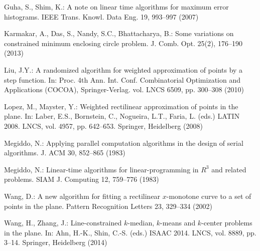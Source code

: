 \documentclass[preprint,10pt]{elsarticle}
\begin{document}
\begin{thebibliography}{10}
Guha, S., Shim, K.: A note on linear time algorithms for maximum error
  histograms. IEEE Trans. Knowl. Data Eng.  19,  993--997 (2007)

Karmakar, A., Das, S., Nandy, S.C., Bhattacharya, B.: Some variations on
  constrained minimum enclosing circle problem. J. Comb. Opt.  25(2),  176--190
  (2013)

Liu, J.Y.: A randomized algorithm for weighted approximation of points by a
  step function. In: Proc. 4th Ann. Int. Conf. Combinatorial Optimization and
  Applications (COCOA), Springer-Verlag. vol. LNCS 6509, pp. 300--308 (2010)

Lopez, M., Mayster, Y.: Weighted rectilinear approximation of points in the
  plane. In: Laber, E.S., Bornstein, C., Nogueira, L.T., Faria, L. (eds.) LATIN 2008.
LNCS, vol. 4957, pp. 642--653. Springer, Heidelberg (2008)

Megiddo, N.: Applying parallel computation algorithms in the design of serial
  algorithms. J. ACM  30,  852--865 (1983)

Megiddo, N.: Linear-time algorithms for linear-programming in ${R}^3$ and
  related problems. SIAM J. Computing  12,  759--776 (1983)

Wang, D.: A new algorithm for fitting a rectilinear $x$-monotone curve to a set
  of points in the plane. Pattern Recognition Letters  23,  329--334 (2002)

Wang, H., Zhang, J.: Line-constrained $k$-median, $k$-means and $k$-center
  problems in the plane. In: Ahn, H.-K., Shin, C.-S. (eds.) ISAAC 2014. LNCS,
  vol. 8889, pp. 3--14. Springer, Heidelberg (2014)

\end{thebibliography}
\end{document}

